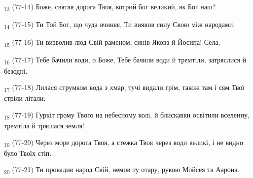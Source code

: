 \begin{tcolorbox}
\textsubscript{13} (77-14) Боже, святая дорога Твоя, котрий бог великий, як Бог наш?
\end{tcolorbox}
\begin{tcolorbox}
\textsubscript{14} (77-15) Ти Той Бог, що чуда вчиняє, Ти виявив силу Свою між народами,
\end{tcolorbox}
\begin{tcolorbox}
\textsubscript{15} (77-16) Ти визволив люд Свій раменом, синів Якова й Йосипа! Села.
\end{tcolorbox}
\begin{tcolorbox}
\textsubscript{16} (77-17) Тебе бачили води, о Боже, Тебе бачили води й тремтіли, затряслися й безодні.
\end{tcolorbox}
\begin{tcolorbox}
\textsubscript{17} (77-18) Лилася струмком вода з хмар, тучі видали грім, також там і сям Твої стріли літали.
\end{tcolorbox}
\begin{tcolorbox}
\textsubscript{18} (77-19) Гуркіт грому Твого на небесному колі, й блискавки освітили вселенну, тремтіла й тряслася земля!
\end{tcolorbox}
\begin{tcolorbox}
\textsubscript{19} (77-20) Через море дорога Твоя, а стежка Твоя через води великі, і не видно було Твоїх стіп.
\end{tcolorbox}
\begin{tcolorbox}
\textsubscript{20} (77-21) Ти провадив народ Свій, немов ту отару, рукою Мойсея та Аарона.
\end{tcolorbox}
